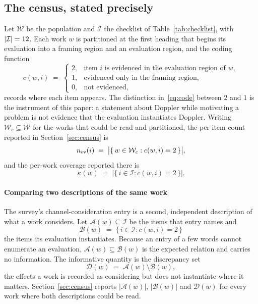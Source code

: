 \documentclass[preprint,11pt,3p]{elsarticle}
\begin{document}
\subsection{The census, stated precisely}
\label{sec:formal}

Let $\mathcal{W}$ be the population and $\mathcal{I}$ the checklist of Table~\ref{tab:checklist},
with $|\mathcal{I}| = 12$. Each work $w$ is partitioned at the first heading that
begins its evaluation into a framing region and an evaluation region, and the coding function
\begin{equation}
  c(w, i) \;=\;
  \begin{cases}
    2, & \text{item } i \text{ is evidenced in the evaluation region of } w, \\
    1, & \text{evidenced only in the framing region}, \\
    0, & \text{not evidenced},
  \end{cases}
  \label{eq:code}
\end{equation}
records where each item appears. The distinction in~\eqref{eq:code} between $2$ and $1$ is the
instrument of this paper: a statement about Doppler while motivating a problem is not evidence
that the evaluation instantiates Doppler. Writing $\mathcal{W}_c \subseteq \mathcal{W}$ for the
works that could be read and partitioned, the per-item count reported in
Section~\ref{sec:census} is
\begin{equation}
  n_{\rm ev}(i) \;=\; \bigl| \{\, w \in \mathcal{W}_c : c(w,i) = 2 \,\} \bigr| ,
  \label{eq:count}
\end{equation}
and the per-work coverage reported there is
\begin{equation}
  \kappa(w) \;=\; \bigl| \{\, i \in \mathcal{I} : c(w,i) = 2 \,\} \bigr| .
  \label{eq:cover}
\end{equation}

\paragraph{Comparing two descriptions of the same work}
The survey's channel-consideration entry is a second, independent description of what a work
considers. Let $\mathcal{A}(w) \subseteq \mathcal{I}$ be the items that entry names and
\begin{equation}
  \mathcal{B}(w) \;=\; \{\, i \in \mathcal{I} : c(w,i) = 2 \,\}
  \label{eq:setB}
\end{equation}
the items its evaluation instantiates. Because an entry of a few words cannot enumerate an
evaluation, $\mathcal{A}(w) \subseteq \mathcal{B}(w)$ is the expected relation and carries no
information. The informative quantity is the discrepancy set
\begin{equation}
  \mathcal{D}(w) \;=\; \mathcal{A}(w) \setminus \mathcal{B}(w) ,
  \label{eq:disc}
\end{equation}
the effects a work is recorded as considering but does not instantiate where it matters.
Section~\ref{sec:census} reports $|\mathcal{A}(w)|$, $|\mathcal{B}(w)|$ and $\mathcal{D}(w)$
for every work where both descriptions could be read.
\end{document}
